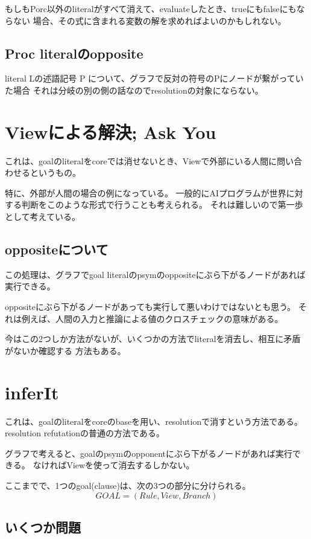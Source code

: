 \documentclass[10pt, onecolumn]{jarticle}   	%
\begin{document}
もしもPorc以外のliteralがすべて消えて、evaluateしたとき、trueにもfalseにもならない
場合、その式に含まれる変数の解を求めればよいのかもしれない。

\subsection{Proc literalのopposite}
literal Lの述語記号 P について、グラフで反対の符号のPにノードが繋がっていた場合
それは分岐の別の側の話なのでresolutionの対象にならない。


\section{Viewによる解決; Ask You}
 これは、goalのliteralをcoreでは消せないとき、Viewで外部にいる人間に問い合わせるというもの。
 
特に、外部が人間の場合の例になっている。
一般的にAIプログラムが世界に対する判断をこのような形式で行うことも考えられる。
それは難しいので第一歩として考えている。

\subsection{oppositeについて}
 この処理は、グラフでgoal literalのpsymのoppositeにぶら下がるノードがあれば実行できる。
 
 oppositeにぶら下がるノードがあっても実行して悪いわけではないとも思う。
それは例えば、人間の入力と推論による値のクロスチェックの意味がある。

今はこの2つしか方法がないが、いくつかの方法でliteralを消去し、相互に矛盾がないか確認する
方法もある。


\section{inferIt}
 これは、goalのliteralをcoreのbaseを用い、resolutionで消すという方法である。
 resolution refutationの普通の方法である。

グラフで考えると、goalのpsymのopponentにぶら下がるノードがあれば実行できる。
なければViewを使って消去するしかない。

ここまでで、1つのgoal(clause)は、次の3つの部分に分けられる。
\begin{equation*}
GOAL = (Rule, View, Branch)
\end{equation*}

\subsection{いくつか問題}
\end{document}
